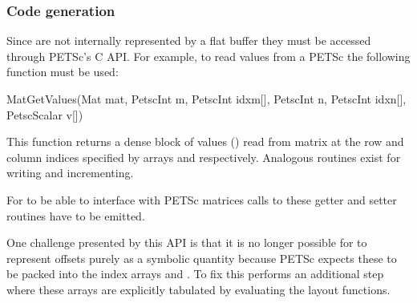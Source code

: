 \documentclass[thesis]{subfiles}
\begin{document}
\subsubsection{Code generation}

Since  are not internally represented by a flat buffer they must be accessed through PETSc's C API.
For example, to read values from a PETSc  the following function must be used:

\begin{cinline}
  MatGetValues(Mat mat,
               PetscInt m, PetscInt idxm[],
               PetscInt n, PetscInt idxn[],
               PetscScalar v[])
\end{cinline}

This function returns a dense block of values () read from matrix  at the row and column indices specified by arrays  and  respectively.
Analogous routines exist for writing and incrementing.

For  to be able to interface with PETSc matrices calls to these getter and setter routines have to be emitted.

One challenge presented by this API is that it is no longer possible for  to represent offsets purely as a symbolic quantity because PETSc expects these to be packed into the index arrays  and .
To fix this  performs an additional step where these arrays are explicitly tabulated by evaluating the layout functions. %

\end{document}
